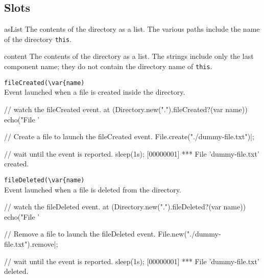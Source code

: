 \subsection{Slots}
\begin{urbiscriptapi}
\item[asList]
  The contents of the directory as a  list.  The
  various paths include the name of the directory \lstinline|this|.

\item[content]
  The contents of the directory as a  list.  The
  strings include only the last component name; they do not contain
  the directory name of \lstinline|this|.

\item \lstinline|fileCreated(\var{name)|\\
  Event launched when a file is created inside the directory.

\begin{urbiscript}
// watch the fileCreated event.
at (Directory.new(".").fileCreated?(var name))
  echo("File '%

// Create a file to launch the fileCreated event.
File.create("./dummy-file.txt")|;

// wait until the event is reported.
sleep(1s);
[00000001] *** File 'dummy-file.txt' created.
\end{urbiscript}

\item \lstinline|fileDeleted(\var{name)|\\
  Event launched when a file is deleted from the directory.

\begin{urbiscript}
// watch the fileDeleted event.
at (Directory.new(".").fileDeleted?(var name))
  echo("File '%

// Remove a file to launch the fileDeleted event.
File.new("./dummy-file.txt").remove|;

// wait until the event is reported.
sleep(1s);
[00000001] *** File 'dummy-file.txt' deleted.
\end{urbiscript}


\end{urbiscriptapi}


